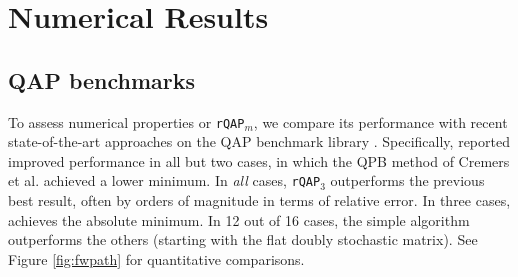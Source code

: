 \documentclass[10pt,journal,cspaper,compsoc]{IEEEtran}
\begin{document}

\section{Numerical Results} %
\label{sub:numerical_results}



\subsection{QAP benchmarks}

To assess numerical properties or \texttt{rQAP}$_m$, we compare its performance with recent state-of-the-art approaches on the QAP benchmark library \cite{Burkard1997}.  Specifically, \cite{Zaslavskiy2009} reported improved performance in all but two cases, in which the QPB method of Cremers et al. \cite{Schellewald2001} achieved a lower minimum.  
In \emph{all} cases, \texttt{rQAP}$_3$ outperforms the previous best result, often by orders of magnitude in terms of relative error. In three cases, \rqapb achieves the absolute minimum.  In 12 out of 16 cases, the simple \rqapa algorithm outperforms the others (starting with the flat doubly stochastic matrix).  See Figure \ref{fig:fwpath} for quantitative comparisons.
\end{document}
